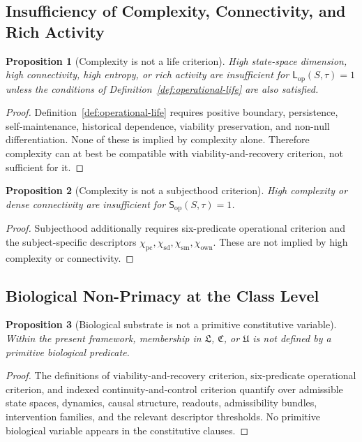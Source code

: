 \documentclass[11pt,a4paper]{article}
\newtheorem{proposition}{Proposition}[section]
\theoremstyle{definition}
\newcommand{\Lop}{\mathsf{L}_{\mathrm{op}}}
\newcommand{\Subop}{\mathsf{S}_{\mathrm{op}}}
\newcommand{\Priv}{\chi_{\mathrm{pc}}}
\newcommand{\SelfDisc}{\chi_{\mathrm{sd}}}
\newcommand{\SelfModel}{\chi_{\mathrm{sm}}}
\newcommand{\Own}{\chi_{\mathrm{own}}}
\newcommand{\LifeClass}{\mathfrak{L}}
\newcommand{\ConClass}{\mathfrak{C}}
\newcommand{\SubClass}{\mathfrak{U}}
\begin{document}
\subsection{Insufficiency of Complexity, Connectivity, and Rich Activity}
\begin{proposition}[Complexity is not a life criterion]
High state-space dimension, high connectivity, high entropy, or rich activity are insufficient for $\Lop(S,\tau)=1$ unless the conditions of Definition~\ref{def:operational-life} are also satisfied.
\end{proposition}

\begin{proof}
Definition~\ref{def:operational-life} requires positive boundary, persistence, self-maintenance, historical dependence, viability preservation, and non-null differentiation. None of these is implied by complexity alone. Therefore complexity can at best be compatible with viability-and-recovery criterion, not sufficient for it.
\end{proof}

\begin{proposition}[Complexity is not a subjecthood criterion]
High complexity or dense connectivity are insufficient for $\Subop(S,\tau)=1$.
\end{proposition}

\begin{proof}
Subjecthood additionally requires six-predicate operational criterion and the subject-specific descriptors $\Priv,\SelfDisc,\SelfModel,\Own$. These are not implied by high complexity or connectivity.
\end{proof}

\subsection{Biological Non-Primacy at the Class Level}
\begin{proposition}[Biological substrate is not a primitive constitutive variable]
Within the present framework, membership in $\LifeClass$, $\ConClass$, or $\SubClass$ is not defined by a primitive biological predicate.
\end{proposition}

\begin{proof}
The definitions of viability-and-recovery criterion, six-predicate operational criterion, and indexed continuity-and-control criterion quantify over admissible state spaces, dynamics, causal structure, readouts, admissibility bundles, intervention families, and the relevant descriptor thresholds. No primitive biological variable appears in the constitutive clauses.
\end{proof}
\end{document}
